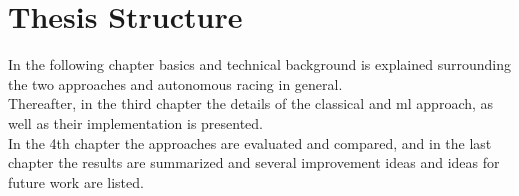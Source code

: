 \section{Thesis Structure}
In the following chapter basics and technical background is explained surrounding the two approaches and autonomous racing in general.\\
Thereafter, in the third chapter the details of the classical and \ac{ml} approach, as well as their implementation is presented.\\
In the 4th chapter the approaches are evaluated and compared,
and in the last chapter the results are summarized and several improvement ideas and ideas for future work are listed.

